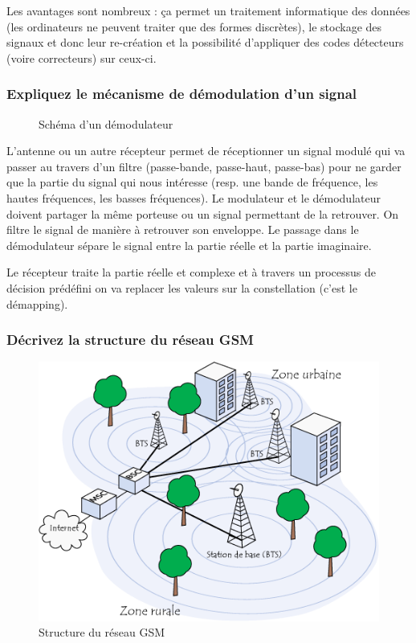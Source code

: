 Les avantages sont nombreux : ça permet un traitement informatique des données (les ordinateurs ne peuvent traiter que des formes discrètes), le stockage des signaux et donc leur re-création et la possibilité d'appliquer des codes détecteurs (voire correcteurs) sur ceux-ci.

\subsubsection{Expliquez le mécanisme de démodulation d'un signal}

\begin{figure}[H]

\caption{Schéma d'un démodulateur}
\end{figure}

L'antenne ou un autre récepteur permet de réceptionner un signal modulé qui va passer au travers d'un filtre (passe-bande, passe-haut, passe-bas) pour ne garder que la partie du signal qui nous intéresse (resp. une bande de fréquence, les hautes fréquences, les basses fréquences). Le modulateur et le démodulateur doivent partager la même porteuse ou un signal permettant de la retrouver. On filtre le signal de manière à retrouver
son enveloppe. Le passage dans le démodulateur sépare le signal entre la partie réelle et la partie imaginaire.

Le récepteur traite la partie réelle et complexe et à travers un processus de décision prédéfini on va replacer les valeurs sur la constellation (c'est le démapping).

\subsubsection{Décrivez la structure du réseau GSM}

\begin{figure}[H]
    \centering
    \includegraphics[width=\linewidth]{img/structure_reseau_gsm.png}
    \caption{Structure du réseau GSM}
\end{figure}

